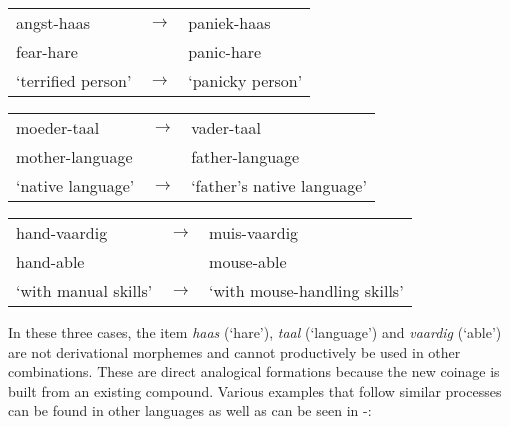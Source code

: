 
\begin{exe}
    \ex \label{exe-dutch-analogies}
    \begin{xlist}
        \ex
        \begin{tabular}[t]{lcl}
          angst-haas           & $\rightarrow$ & paniek-haas                  \\
          fear-hare            &               & panic-hare                   \\
          `terrified person'   & $\rightarrow$ & `panicky person'             \\
        \end{tabular}
        \ex
        \begin{tabular}[t]{lcl}
          moeder-taal          & $\rightarrow$ & vader-taal                   \\
          mother-language      &               & father-language              \\
          `native language'    & $\rightarrow$ & `father's native language'  \\
        \end{tabular}
        \ex
        \begin{tabular}[t]{lcl}
          hand-vaardig         & $\rightarrow$ & muis-vaardig                 \\
          hand-able            &               & mouse-able                   \\
          `with manual skills' & $\rightarrow$ & `with mouse-handling skills' \\
        \end{tabular}
    \end{xlist}
\end{exe}

In these three cases, the item \textit{haas} (`hare'), \textit{taal} (`language') and \textit{vaardig} (`able') are not derivational morphemes and cannot productively be used in other combinations. These are direct analogical formations because the new coinage is built from an existing compound. Various examples that follow similar processes can be found in other languages as well as can be seen in -:


